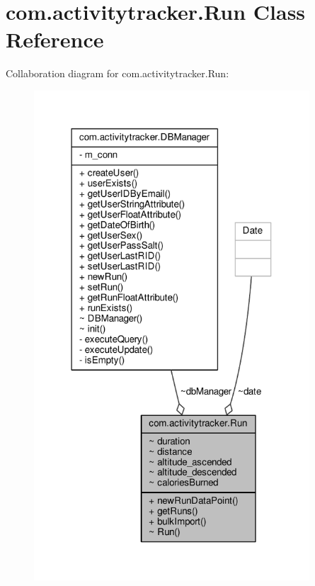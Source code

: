 \hypertarget{classcom_1_1activitytracker_1_1_run}{}\section{com.\+activitytracker.\+Run Class Reference}
\label{classcom_1_1activitytracker_1_1_run}


Collaboration diagram for com.\+activitytracker.\+Run\+:
\nopagebreak
\begin{figure}[H]
\begin{center}
\leavevmode
\includegraphics[width=292pt]{classcom_1_1activitytracker_1_1_run__coll__graph}
\end{center}
\end{figure}
